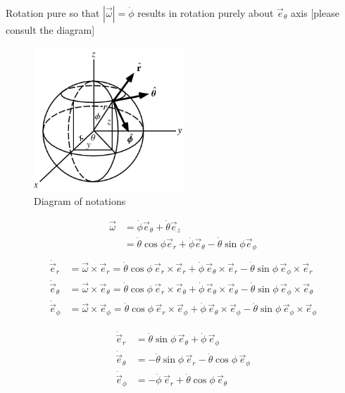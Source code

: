\documentclass[10pts, letterpaper]{article}
\begin{document}
Rotation pure so that $|  \vec{\omega} | = \dot{\phi}$ results in rotation purely about $\vec{e}_\theta$ axis [please consult the diagram]

\begin{figure}[H]
	\centering
	\includegraphics[width=0.5\textwidth]{ss/6/coord.png}
	\caption{Diagram of notations}
	\label{fig:}
\end{figure}

\begin{align*}
	\vec{\omega} &= \dot{\phi} \vec{e}_\theta + \dot{\theta} \vec{e}_z	 \\
&= \dot\theta \cos\phi \vec{e}_r + \dot \phi \vec{e}_\theta - \dot \theta \sin \phi \vec{e}_\phi \\
\end{align*}
	      \begin{align*}
              \dot{\vec{e}}_r &= \vec{\omega} \times \vec{e}_r
              = \dot\theta \cos\phi \, \vec{e}_r \times \vec{e}_r
              + \dot\phi \, \vec{e}_\theta \times \vec{e}_r
              - \dot\theta \sin\phi \, \vec{e}_{\phi} \times \vec{e}_r \\
              \dot{\vec{e}}_{\theta} &= \vec{\omega} \times \vec{e}_{\theta}
              = \dot\theta \cos\phi \,\vec{e}_r \times \vec{e}_\theta
              + \dot\phi \, \vec{e}_\theta \times \vec{e}_\theta
              - \dot\theta \sin\phi \,\vec{e}_{\phi} \times \vec{e}_\theta \\
              \dot{\vec{e}}_{\phi} &= \vec{\omega} \times \vec{e}_{\phi}
              = \dot\theta \cos\phi \,\vec{e}_r \times \vec{e}_\phi
              + \dot\phi \, \vec{e}_\theta \times \vec{e}_\phi
              - \dot\theta \sin\phi \,\vec{e}_{\phi} \times \vec{e}_\phi
              \end{align*}

	  \begin{align*}
              \dot{\vec{e}}_r &= \dot\theta \sin\phi \,\vec{e}_{\theta}
              + \dot\phi \,\vec{e}_{\phi} \\
              \dot{\vec{e}}_{\theta} &= - \dot\theta \sin\phi \,\vec{e}_r
              - \dot\theta \cos\phi \,\vec{e}_{\phi} \\
              \dot{\vec{e}}_{\phi} &= - \dot\phi \,\vec{e}_r
              + \dot\theta \cos\phi \,\vec{e}_{\theta}
              \end{align*}
\end{document}
